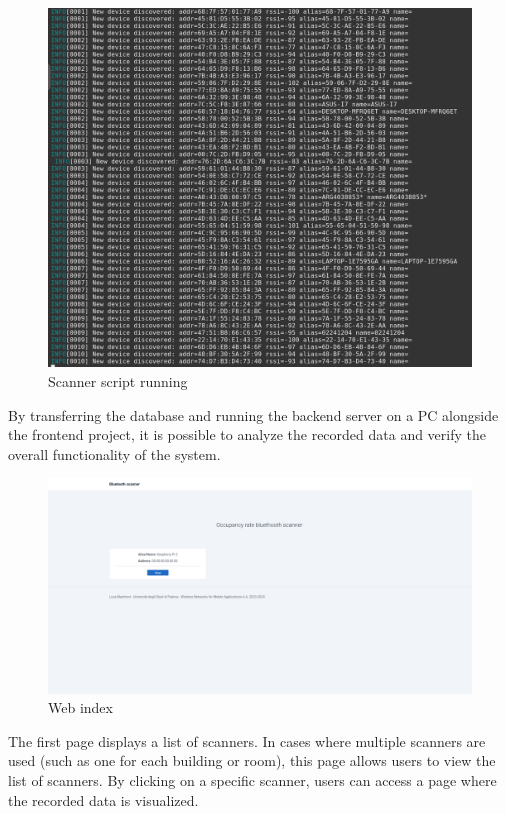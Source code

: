 \documentclass[a4paper, 11pt]{article}
\begin{document}
\begin{figure}
    \centering
    \includegraphics[width=1\linewidth]{images/ScanningScreen.png}
    \caption{Scanner script running}
    \label{fig:script-running}
\end{figure}

By transferring the database and running the backend server on a PC alongside the frontend project, it is possible to analyze the recorded data and verify the overall functionality of the system.

\begin{figure}[H]
    \centering
    \includegraphics[width=1\linewidth]{images/DeviceIndexScreenshot.png}
    \caption{Web index}
    \label{fig:web-index}
\end{figure}

The first page displays a list of scanners. In cases where multiple scanners are used (such as one for each building or room), this page allows users to view the list of scanners. By clicking on a specific scanner, users can access a page where the recorded data is visualized.
\end{document}
